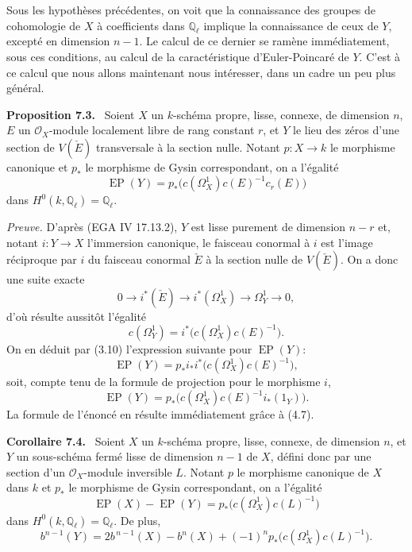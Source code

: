 \documentclass[11pt]{article}
\newenvironment{statement}[1]{\par\medskip\noindent\textbf{#1.}\ }{\par\medskip}
\begin{document}
Sous les hypothèses précédentes, on voit que la connaissance des groupes de cohomologie de $X$ à coefficients dans $\mathbb Q_\ell$ implique la connaissance de ceux de $Y$, excepté en dimension $n-1$. Le calcul de ce dernier se ramène immédiatement, sous ces conditions, au calcul de la caractéristique d'Euler-Poincaré de $Y$. C'est à ce calcul que nous allons maintenant nous intéresser, dans un cadre un peu plus général.

\begin{statement}{Proposition 7.3}
Soient $X$ un $k$-schéma propre, lisse, connexe, de dimension $n$, $E$ un $\mathcal O_X$-module localement libre de rang constant $r$, et $Y$ le lieu des zéros d'une section de $V(\check E)$ transversale à la section nulle. Notant $p:X\to k$ le morphisme canonique et $p_*$ le morphisme de Gysin correspondant, on a l'égalité
\[
\operatorname{EP}(Y)=p_*\bigl(c(\Omega_X^1)c(E)^{-1}c_r(E)\bigr)
\]
dans $H^0(k,\mathbb Q_\ell)=\mathbb Q_\ell$.
\end{statement}

\emph{Preuve.} D'après (EGA IV 17.13.2), $Y$ est lisse purement de dimension $n-r$ et, notant $i:Y\to X$ l'immersion canonique, le faisceau conormal à $i$ est l'image réciproque par $i$ du faisceau conormal $\check E$ à la section nulle de $V(\check E)$. On a donc une suite exacte
\[
0\to i^*(\check E)\to i^*(\Omega_X^1)\to\Omega_Y^1\to0,
\tag{7.3.1}
\]
d'où résulte aussitôt l'égalité
\[
c(\Omega_Y^1)=i^*\bigl(c(\Omega_X^1)c(E)^{-1}\bigr).
\tag{7.3.2}
\]
On en déduit par (3.10) l'expression suivante pour $\operatorname{EP}(Y)$:
\[
\operatorname{EP}(Y)=p_*i_*i^*\bigl(c(\Omega_X^1)c(E)^{-1}\bigr),
\]
soit, compte tenu de la formule de projection pour le morphisme $i$,
\[
\operatorname{EP}(Y)=p_*\bigl(c(\Omega_X^1)c(E)^{-1}i_*(1_Y)\bigr).
\]
La formule de l'énoncé en résulte immédiatement grâce à (4.7).

\begin{statement}{Corollaire 7.4}
Soient $X$ un $k$-schéma propre, lisse, connexe, de dimension $n$, et $Y$ un sous-schéma fermé lisse de dimension $n-1$ de $X$, défini donc par une section d'un $\mathcal O_X$-module inversible $L$. Notant $p$ le morphisme canonique de $X$ dans $k$ et $p_*$ le morphisme de Gysin correspondant, on a l'égalité
\[
\operatorname{EP}(X)-\operatorname{EP}(Y)=p_*\bigl(c(\Omega_X^1)c(L)^{-1}\bigr)
\tag{7.4.1}
\]
dans $H^0(k,\mathbb Q_\ell)=\mathbb Q_\ell$. De plus,
\[
b^{n-1}(Y)=2b^{\,n-1}(X)-b^n(X)+(-1)^n p_*\bigl(c(\Omega_X^1)c(L)^{-1}\bigr).
\tag{7.4.2}
\]
\end{statement}
\end{document}
